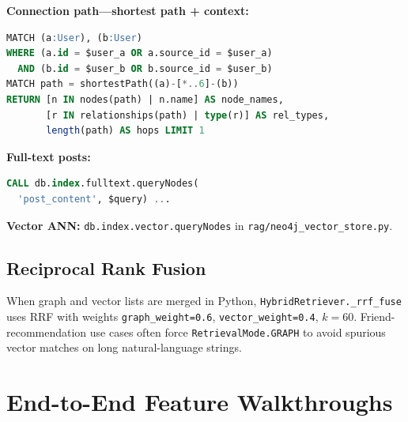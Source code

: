 \documentclass[conference]{IEEEtran}
\begin{document}
\noindent\textbf{Connection path---shortest path + context:}
\begin{lstlisting}[language=SQL, basicstyle=\ttfamily\tiny]
MATCH (a:User), (b:User)
WHERE (a.id = $user_a OR a.source_id = $user_a)
  AND (b.id = $user_b OR b.source_id = $user_b)
MATCH path = shortestPath((a)-[*..6]-(b))
RETURN [n IN nodes(path) | n.name] AS node_names,
       [r IN relationships(path) | type(r)] AS rel_types,
       length(path) AS hops LIMIT 1
\end{lstlisting}

\noindent\textbf{Full-text posts:}
\begin{lstlisting}[language=SQL, basicstyle=\ttfamily\footnotesize]
CALL db.index.fulltext.queryNodes(
  'post_content', $query) ...
\end{lstlisting}

\noindent\textbf{Vector ANN:} \texttt{db.index.vector.queryNodes} in \texttt{rag/neo4j\_vector\_store.py}.

\subsection{Reciprocal Rank Fusion}
When graph and vector lists are merged in Python, \texttt{HybridRetriever.\_rrf\_fuse} uses RRF with weights \texttt{graph\_weight=0.6}, \texttt{vector\_weight=0.4}, $k=60$. Friend-recommendation use cases often force \texttt{RetrievalMode.GRAPH} to avoid spurious vector matches on long natural-language strings.

\section{End-to-End Feature Walkthroughs}
\end{document}
